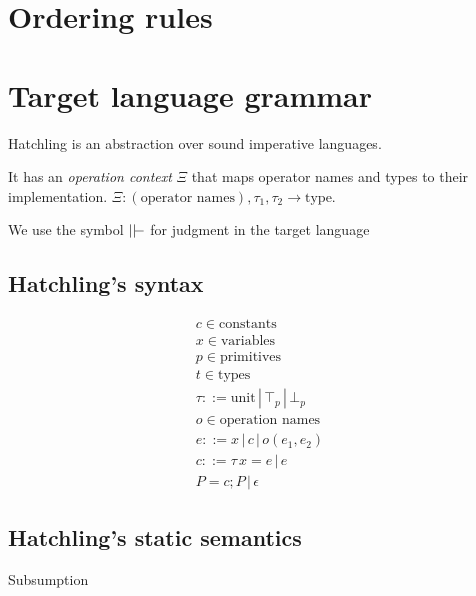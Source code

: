 \section{Ordering rules}
\label{fig:subtype}

\section{Target language grammar}
Hatchling is an abstraction over sound imperative languages.

It has an \textit{operation context} $\Xi$ that maps operator names and types to their implementation. $\Xi : (\textrm{operator names}), \tau_1, \tau_2 \rightarrow \textrm{type}$.

We use the symbol $\tvdash$ for judgment in the target language

\subsection{Hatchling's syntax}
\begin{gather*}
c \in\textrm{constants}\\
x \in\textrm{variables}\\
p\in\textrm{primitives}\\
t\in\textrm{types}\\
\tau ::= \textrm{unit} \,|\, \top_p \,|\, \bot_p \\
o \in \textrm{operation names} \\
e ::= x \,|\, c \,|\, o(e_1, e_2) \\
c ::= \tau \, x = e\,|\, e \\
P  =  c;P \,|\, \epsilon 
\end{gather*}

\subsection{Hatchling's static semantics}
Subsumption
\begin{mathpar}
\end{mathpar}


